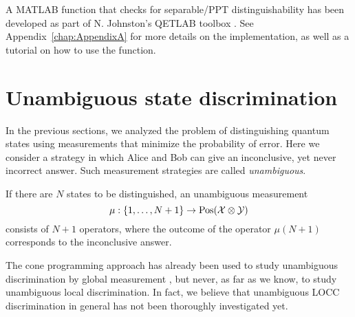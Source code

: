A MATLAB function that checks for separable/PPT distinguishability
has been developed as part of N. Johnston's QETLAB toolbox \cite{Johnston2015}. 
See Appendix~\ref{chap:AppendixA} for more details on the implementation,
as well as a tutorial on how to use the function. 

\section{Unambiguous state discrimination}

\label{sec:unambiguous-program}
In the previous sections, we analyzed the problem of distinguishing quantum states 
using measurements that minimize the probability of error.
Here we consider a strategy in which Alice and Bob can give an inconclusive, yet
never incorrect answer. Such measurement strategies are called \emph{unambiguous}.

If there are $N$ states to be distinguished, an unambiguous measurement 
\[
  \mu : \{1, \ldots, N+1\} \rightarrow \mathrm{Pos}(\mathcal{X}\otimes\mathcal{Y})
\]
consists of $N+1$ operators, where the outcome of the operator $\mu(N+1)$ corresponds 
to the inconclusive answer.

The cone programming approach has already been used to study unambiguous 
discrimination by global measurement \cite{Eldar03}, 
but never, as far as we know, to study unambiguous local discrimination. 
In fact, we believe that unambiguous LOCC discrimination in general has not 
been thoroughly investigated yet.

